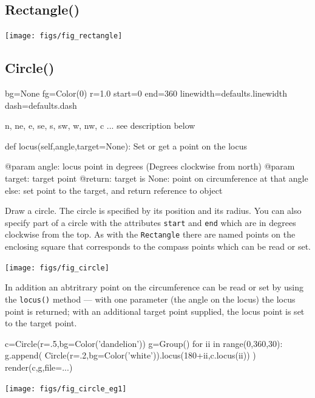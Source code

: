 \documentclass[a4paper]{book}
\begin{document}
\subsection{Rectangle()}
\label{sec:rectangle}

\begin{center}
  \texttt{[image: figs/fig\_rectangle]}
\end{center}

\subsection{Circle()}
\label{sec:circle}
\begin{python}
    bg=None
    fg=Color(0)
    r=1.0
    start=0
    end=360
    linewidth=defaults.linewidth
    dash=defaults.dash
    
    n, ne, e, se, s, sw, w, nw, c  ... see description below

    def locus(self,angle,target=None):
        Set or get a point on the locus

        @param angle: locus point in degrees
                      (Degrees clockwise from north)
        @param target: target point
        @return: target is None: point on circumference at that angle
                 else: set point to the target, and return reference
                       to object

\end{python}
Draw a circle. The circle is specified by its position and its
radius.  You can also specify part of a circle with the attributes
\Verb|start| and \Verb|end| which are in degrees clockwise from the
top. As with the \Verb|Rectangle| there are named points on the
enclosing square that corresponds to the compass points which can be
read or set.
\begin{center}
  \texttt{[image: figs/fig\_circle]}
\end{center}
In addition an abtritrary point on the circumference can be read or
set by using the \Verb|locus()| method --- with one parameter (the
angle on the locus) the locus point is returned; with an additional
target point supplied, the locus point is set to the target point.
\begin{example}
\begin{python}
c=Circle(r=.5,bg=Color('dandelion'))
g=Group()
for ii in range(0,360,30):
    g.append(
        Circle(r=.2,bg=Color('white')).locus(180+ii,c.locus(ii))
        )
render(c,g,file=...)
\end{python}
\begin{center}
  \texttt{[image: figs/fig\_circle\_eg1]}
\end{center}
\end{example}
\end{document}

